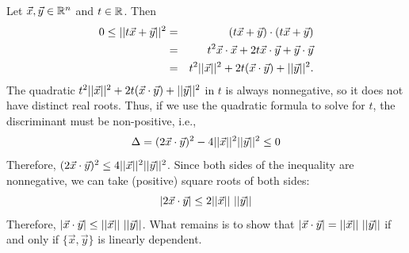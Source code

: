 \documentclass[pdf,9pt]{beamer}
\begin{document}
\begin{frame}[fragile]
\begin{proofnoend}
    Let $\vec{x},\vec{y}\in\mathbb{R}^n$ and $t\in\mathbb{R}$.
    Then
    \begin{eqnarray*}
	0\leq ||t\vec{x}+\vec{y}||^2
	& = &  (t\vec{x}+\vec{y})\cdot (t\vec{x}+\vec{y}) \\
	& = &  t^2\vec{x}\cdot\vec{x}+ 2t\vec{x}\cdot\vec{y} +\vec{y}\cdot\vec{y}\\
	& = &  t^2||\vec{x}||^2+ 2t(\vec{x}\cdot\vec{y}) +||\vec{y}||^2.
    \end{eqnarray*}
    The quadratic $t^2||\vec{x}||^2+ 2t(\vec{x}\cdot\vec{y}) +||\vec{y}||^2$
    in $t$ is always nonnegative, so it does not have distinct real roots.
    Thus, if we use the quadratic formula to solve for $t$, the discriminant
    must be non-positive, i.e.,
    \begin{align*}
       \Delta = (2\vec{x}\cdot\vec{y})^2-4||\vec{x}||^2 ||\vec{y}||^2 \leq 0
    \end{align*}
    Therefore,
    $(2\vec{x}\cdot\vec{y})^2\leq 4||\vec{x}||^2||\vec{y}||^2$.
    Since both sides of the inequality are nonnegative, we can take
    (positive) square roots of both sides:
    \[ |2\vec{x}\cdot\vec{y}|\leq 2||\vec{x}||~||\vec{y}||\]
    Therefore,
    $|\vec{x}\cdot\vec{y}|\leq ||\vec{x}||~||\vec{y}||$.
    What remains is to show that
    $|\vec{x}\cdot\vec{y}|=||\vec{x}||~||\vec{y}||$
    if and only if $\{\vec{x},\vec{y}\}$ is linearly dependent.
    \myQED
\end{proofnoend}
\end{frame}
\end{document}
